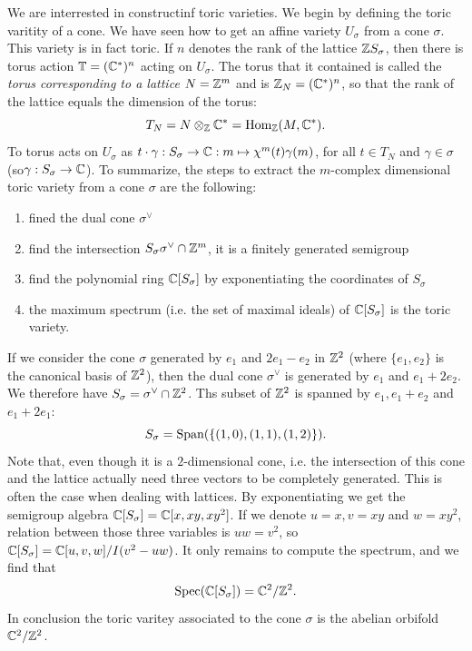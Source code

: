             We are interrested in constructinf toric varieties. We begin by defining the toric varitity of a cone. We have seen how to get an affine variety $U_\sigma$ from a cone $\sigma$. This variety is in fact toric. If $n$ denotes the rank of the lattice $\mathbb{Z} S_\sigma$, then there is torus action $\mathbb{T}=(\mathbb{C}^*)^n$ acting on $U_\sigma$. The torus that it contained is called the \emph{torus corresponding to a lattice} $N=\mathbb{Z}^m$ and is $\mathbb{Z}_N=(\mathbb{C}^*)^n$, so that the rank of the lattice equals the dimension of the torus:
            \begin{equation}
                T_N = N\otimes_{\mathbb{Z}}\mathbb{C}^*=\text{Hom}_{\mathbb{Z}}(M,\mathbb{C}^*).
            \end{equation}
            To torus acts on $U_\sigma$ as $t\cdot\gamma:S_\sigma\to\mathbb{C}:m\mapsto\chi^m(t)\gamma(m)$, for all $t\in T_N$ and $\gamma\in\sigma$ (so$\gamma:S_\sigma\to\mathbb{C}$). To summarize, the steps to extract the $m$-complex dimensional toric variety from a cone $\sigma$ are the following:
            \begin{enumerate}
                \item fined the dual cone $\sigma^\vee$
                \item find the intersection $S_\sigma \sigma^\vee\cap\mathbb{Z}^m$, it is a finitely generated semigroup
                \item find the polynomial ring $\mathbb{C}[S_\sigma]$ by exponentiating the coordinates of $S_\sigma$
                \item the maximum spectrum (i.e. the set of maximal ideals) of $\mathbb{C}[S_\sigma]$ is the toric variety.
            \end{enumerate}
            \begin{examp*}
                If we consider the cone $\sigma$ generated by $e_1$ and $2e_1-e_2$ in $\mathbb{Z}^2$ (where $\{e_1,e_2\}$ is the canonical basis of $\mathbb{Z}^2$), then the dual cone $\sigma^\vee$ is generated by $e_1$ and $e_1+2e_2$. We therefore have $S_\sigma=\sigma^\vee\cap\mathbb{Z}^2$. Ths subset of $\mathbb{Z}^2$ is spanned by $e_1,e_1+e_2$ and $e_1+2e_1$:
                \begin{equation}
                    S_\sigma=\text{Span}(\{(1,0),(1,1),(1,2)\}).
                \end{equation}
                Note that, even though it is a $2$-dimensional cone, i.e. the intersection of this cone and the lattice actually need three vectors to be completely generated. This is often the case when dealing with lattices.
                By exponentiating we get the semigroup algebra $\mathbb{C}[S_\sigma]=\mathbb{C}[x,xy,xy^2]$. If we denote $u=x,v=xy$ and $w=xy^2$, relation between those three variables is $uw=v^2$, so $\mathbb{C}[S_\sigma]=\mathbb{C}[u,v,w]/I(v^2-uw)$. It only remains to compute the spectrum, and we find that
                \begin{equation}
                    \text{Spec}(\mathbb{C}[S_\sigma])=\mathbb{C}^2/\mathbb{Z}^2.
                \end{equation}
                In conclusion the toric varitey associated to the cone $\sigma$ is the abelian orbifold $\mathbb{C}^2/\mathbb{Z}^2$.
            \end{examp*}
